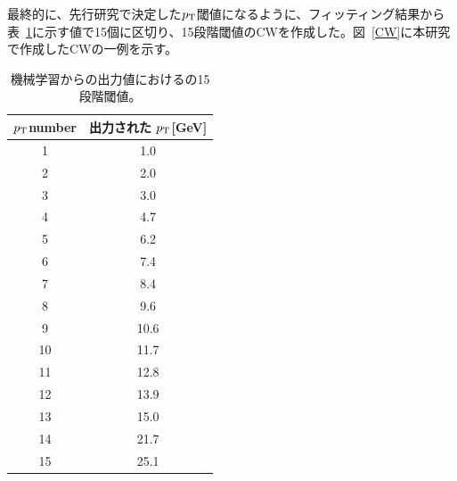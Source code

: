 最終的に、先行研究\cite{article:shiomi-mron}で決定した$p_{\rm{T}}$閾値になるように、フィッティング結果から表~\ref{Effective_number}に示す値で15個に区切り、15段階閾値のCWを作成した。図~\ref{CW}に本研究で作成したCWの一例を示す。
\begin{table}[thb]
\centering
    \caption{機械学習からの出力値におけるの15段階閾値。}
    \label{Effective_number}
    \begin{tabular}{|c|c|}
        \hline
        $p_{\rm{T}}$number & 出力された $p_{\rm{T}}$[GeV]\\
        \hline
        1 & 1.0\\
        \hline
        2 & 2.0\\
        \hline
        3 & 3.0\\
        \hline
        4 & 4.7\\
        \hline
        5 & 6.2\\
        \hline
        6 & 7.4\\
        \hline
        7 & 8.4\\
        \hline
        8 & 9.6\\
        \hline
        9 & 10.6\\
        \hline
        10 & 11.7\\
        \hline
        11 & 12.8\\
        \hline
        12 & 13.9\\
        \hline
        13 & 15.0\\
        \hline
        14 & 21.7\\
        \hline
        15 & 25.1\\
        \hline
        
    \end{tabular}
\end{table}


